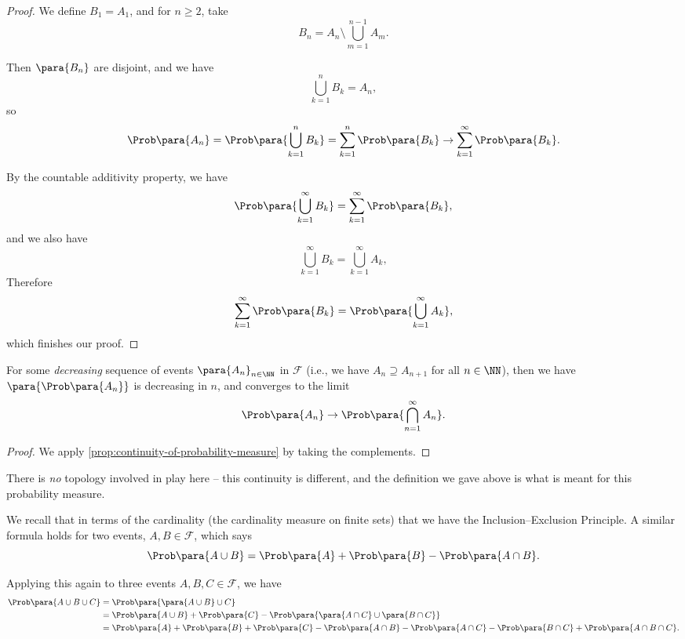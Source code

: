 \begin{proof}
    We define \(B_1 = A_1\), and for \(n \geq 2\), take
    \[
        B_n = A_n \setminus \bigcup_{m = 1}^{n - 1} A_m.
    \]

    Then \(\para{B_n}\) are disjoint, and we have
    \[
        \bigcup_{k = 1}^{n} B_k = A_n,
    \]
    so
    \[
        \Prob\para{A_n} = \Prob\para{\bigcup_{k = 1}^{n} B_k} = \sum_{k = 1}^{n} \Prob\para{B_k} \to \sum_{k = 1}^{\infty} \Prob\para{B_k}.
    \]

    By the countable additivity property, we have
    \[
        \Prob\para{\bigcup_{k = 1}^{\infty} B_k} = \sum_{k = 1}^{\infty} \Prob\para{B_k},
    \]
    and we also have
    \[
        \bigcup_{k = 1}^{\infty} B_k = \bigcup_{k = 1}^{\infty} A_k,
    \]
    Therefore
    \[
        \sum_{k = 1}^{\infty} \Prob\para{B_k} = \Prob\para{\bigcup_{k = 1}^{\infty} A_k},
    \]
    which finishes our proof.
\end{proof}

\begin{corollary}
    \label{cor:continuity-probability-measure-decreasing-sequence}%
     For some \emph{decreasing} sequence of events \(\para{A_n}_{n \in \NN}\) in \(\mathcal{F}\) (i.e., we have \(A_n \supseteq A_{n + 1}\) for all \(n \in \NN\)), then we have \(\para{\Prob\para{A_n}}\) is decreasing in \(n\), and converges to the limit
    \[
        \Prob\para{A_n} \to \Prob\para{\bigcap_{n = 1}^{\infty} A_n}.
    \]
\end{corollary}

\begin{proof}
    We apply \autoref{prop:continuity-of-probability-measure} by taking the complements.
\end{proof}

\begin{remark}
    There is \emph{no} topology involved in play here -- this continuity is different, and the definition we gave above is what is meant for this probability measure.
\end{remark}

We recall that in terms of the cardinality (the cardinality measure on finite sets) that we have the Inclusion--Exclusion Principle. A similar formula holds for two events, \(A, B \in \mathcal{F}\), which says
\[
    \Prob\para{A \cup B} = \Prob\para{A} + \Prob\para{B} - \Prob\para{A \cap B}.
\]

Applying this again to three events \(A, B, C \in \mathcal{F}\), we have
\begin{align*}
    \Prob\para{A \cup B \cup C} &=  \Prob\para{\para{A \cup B} \cup C}\\
    &= \Prob\para{A \cup B} + \Prob\para{C} - \Prob\para{\para{A \cap C} \cup \para{B \cap C}} \\
    &= \Prob\para{A} + \Prob\para{B} + \Prob\para{C} - \Prob\para{A \cap B} - \Prob\para{A \cap C} - \Prob\para{B \cap C} + \Prob\para{A \cap B \cap C}.
\end{align*}

